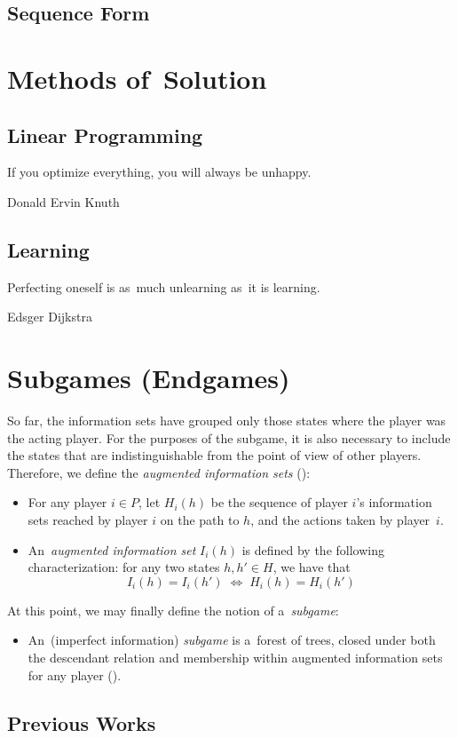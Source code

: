 \subsection{Sequence Form}

\section{Methods of~Solution}

\subsection{Linear Programming}
{
  \setlength{\epigraphwidth}{0.65\textwidth}
  \epigraph{
    If you optimize everything, you will always be unhappy.
  }{Donald Ervin Knuth}
}

\subsection{Learning}
{
  \setlength{\epigraphwidth}{0.65\textwidth}
  \epigraph{
    Perfecting oneself is as~much unlearning as~it is learning.
  }{Edsger Dijkstra}
}

\section{Subgames (Endgames)}

So far, the information sets have grouped only those states where the player was the acting player.
For the purposes of the subgame, it is also necessary to include the states that are indistinguishable from the point of view of other players.
Therefore, we define the \emph{augmented information sets} (\cite{BurchJohansonBowling13}):

\begin{itemize}
  \item For any player $i \in P$, let $H_i(h)$ be the sequence of player $i$'s information sets reached by player $i$ on the path to $h$, and the actions taken by player~$i$.
  \item An~\emph{augmented information set} $I_i(h)$ is defined by the following characterization:
    for any two states $h, h' \in H$, we have that 
    \[ I_i (h) = I_i (h') \; \Longleftrightarrow \; H_i (h) = H_i (h') \]
\end{itemize}

At this point, we may finally define the notion of a~\emph{subgame}:

\begin{itemize}
  \item An~(imperfect information) \emph{subgame} is a~forest of trees, closed under both the descendant relation and membership within augmented information sets for any player (\cite{BurchJohansonBowling13}).
\end{itemize}

\subsection{Previous Works}
